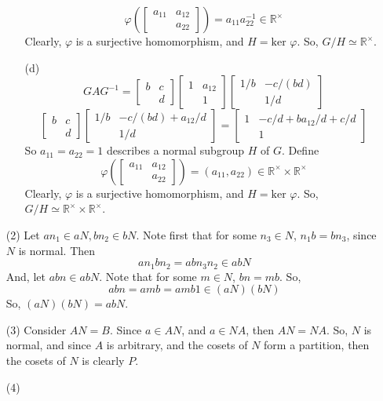 \begin{itemize}
\begin{itemize}
$$\varphi\left( \begin{bmatrix}
a_{11} & a_{12} \\
& a_{22}
\end{bmatrix}\right) = a_{11}a_{22}^{-1} \in \mathbb{R}^\times$$
Clearly, $\varphi$ is a surjective homomorphism, and $H = \text{ker }\varphi$. So, $G/H \simeq \mathbb{R}^\times$.
\item[(d)]
$$GAG^{-1} = \begin{bmatrix}
b & c \\
& d
\end{bmatrix}\begin{bmatrix}
1 & a_{12} \\
& 1
\end{bmatrix}\begin{bmatrix}
1/b & -c/(bd) \\
& 1/d
\end{bmatrix}$$
$$\begin{bmatrix}
b & c \\
& d
\end{bmatrix}\begin{bmatrix}
1/b & -c/(bd) + a_{12}/d \\
& 1/d
\end{bmatrix} = \begin{bmatrix}
1 & -c/d + ba_{12}/d + c/d \\
& 1
\end{bmatrix}$$
So $a_{11} = a_{22} = 1$ describes a normal subgroup $H$ of $G$. Define
$$\varphi\left( \begin{bmatrix}
a_{11} & a_{12}\\
& a_{22}
\end{bmatrix}\right) = (a_{11}, a_{22}) \in \mathbb{R}^\times \times  \mathbb{R}^\times$$
Clearly, $\varphi$ is a surjective homomorphism, and $H = \text{ker }\varphi$. So, $G/H \simeq \mathbb{R}^\times \times \mathbb{R}^\times$.
\end{itemize}
\item[(2)]
Let $an_1 \in aN, bn_2 \in bN$. Note first that for some $n_3 \in N$, $n_1b = bn_3$, since $N$ is normal. Then
$$an_1bn_2 = abn_3n_2 \in abN$$
And, let $abn \in abN$. Note that for some $m \in N$, $bn = mb$. So,
$$abn = amb = amb1 \in (aN)(bN)$$
So, $(aN)(bN) = abN$.
\item[(3)]
Consider $AN = B$. Since $a \in AN$, and $a \in NA$, then $AN = NA$. So, $N$ is normal, and since $A$ is arbitrary, and the cosets of $N$ form a partition, then the cosets of $N$ is clearly $P$.
\item[(4)]

\end{itemize}
